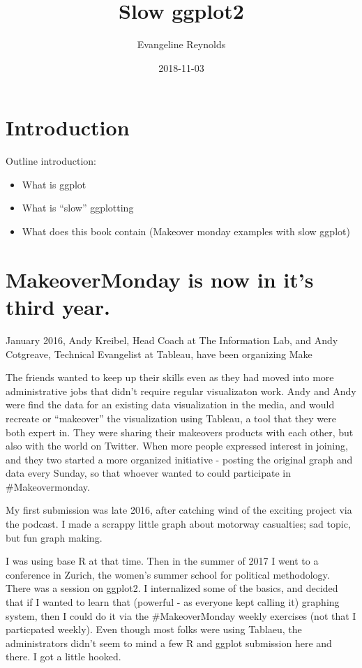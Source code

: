 \documentclass[]{book}
\title{Slow ggplot2}
\author{Evangeline Reynolds}
\date{2018-11-03}
\providecommand{\tightlist}{%
  \setlength{\itemsep}{0pt}\setlength{\parskip}{0pt}}
\theoremstyle{definition}
\theoremstyle{definition}
\theoremstyle{definition}
\theoremstyle{remark}
\begin{document}
\maketitle

{
\setcounter{tocdepth}{1}
\tableofcontents
}
\chapter{Introduction}\label{intro}

Outline introduction:

\begin{itemize}
\tightlist
\item
  What is ggplot
\item
  What is ``slow'' ggplotting
\item
  What does this book contain (Makeover monday examples with slow
  ggplot)
\end{itemize}

\chapter{MakeoverMonday is now in it's third
year.}\label{makeovermonday-is-now-in-its-third-year.}

January 2016, Andy Kreibel, Head Coach at The Information Lab, and Andy
Cotgreave, Technical Evangelist at Tableau, have been organizing Make

The friends wanted to keep up their skills even as they had moved into
more administrative jobs that didn't require regular visualizaton work.
Andy and Andy were find the data for an existing data visualization in
the media, and would recreate or ``makeover'' the visualization using
Tableau, a tool that they were both expert in. They were sharing their
makeovers products with each other, but also with the world on Twitter.
When more people expressed interest in joining, and they two started a
more organized initiative - posting the original graph and data every
Sunday, so that whoever wanted to could participate in \#Makeovermonday.

My first submission was late 2016, after catching wind of the exciting
project via the podcast. I made a scrappy little graph about motorway
casualties; sad topic, but fun graph making.

I was using base R at that time. Then in the summer of 2017 I went to a
conference in Zurich, the women's summer school for political
methodology. There was a session on ggplot2. I internalized some of the
basics, and decided that if I wanted to learn that (powerful - as
everyone kept calling it) graphing system, then I could do it via the
\#MakeoverMonday weekly exercises (not that I particpated weekly). Even
though most folks were using Tablaeu, the administrators didn't seem to
mind a few R and ggplot submission here and there. I got a little
hooked.
\end{document}
